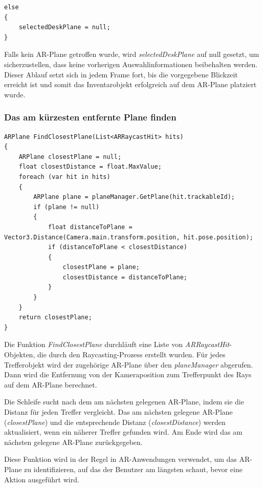 \begin{lstlisting}[style=csharp, caption={Plane null setzen}, label=code:NoPlaneHit]
else
{
    selectedDeskPlane = null;
}
\end{lstlisting}
Falls kein AR-Plane getroffen wurde, wird \textit{selectedDeskPlane} auf null gesetzt, um sicherzustellen, dass keine
vorherigen Auswahlinformationen beibehalten werden.\\

Dieser Ablauf setzt sich in jedem Frame fort, bis die vorgegebene Blickzeit erreicht ist und somit das Inventarobjekt
erfolgreich auf dem AR-Plane platziert wurde.\\

\subsubsection{Das am kürzesten entfernte Plane finden}
\begin{lstlisting}[style=csharp, caption={Kürzest entfernte Plane - Funktion}, label=code:findclosestplane]
ARPlane FindClosestPlane(List<ARRaycastHit> hits)
{
    ARPlane closestPlane = null;
    float closestDistance = float.MaxValue;
    foreach (var hit in hits)
    {
        ARPlane plane = planeManager.GetPlane(hit.trackableId);
        if (plane != null)
        {
            float distanceToPlane = Vector3.Distance(Camera.main.transform.position, hit.pose.position);
            if (distanceToPlane < closestDistance)
            {
                closestPlane = plane;
                closestDistance = distanceToPlane;
            }
        }
    }
    return closestPlane;
}
\end{lstlisting}
Die Funktion \textit{FindClosestPlane} durchläuft eine Liste von \textit{ARRaycastHit}-Objekten, die durch den
Raycasting-Prozess erstellt wurden. Für jedes Trefferobjekt wird der zugehörige AR-Plane über den \textit{planeManager} abgerufen.
Dann wird die Entfernung von der Kameraposition zum Trefferpunkt des Rays auf dem AR-Plane berechnet.

Die Schleife sucht nach dem am nächsten gelegenen AR-Plane, indem sie die Distanz für jeden Treffer vergleicht.
Das am nächsten gelegene AR-Plane (\textit{closestPlane}) und die entsprechende Distanz (\textit{closestDistance})
werden aktualisiert, wenn ein näherer Treffer gefunden wird. Am Ende wird das am nächsten gelegene AR-Plane zurückgegeben.

Diese Funktion wird in der Regel in AR-Anwendungen verwendet, um das AR-Plane zu identifizieren, auf das der Benutzer am
längsten schaut, bevor eine Aktion ausgeführt wird.\\

